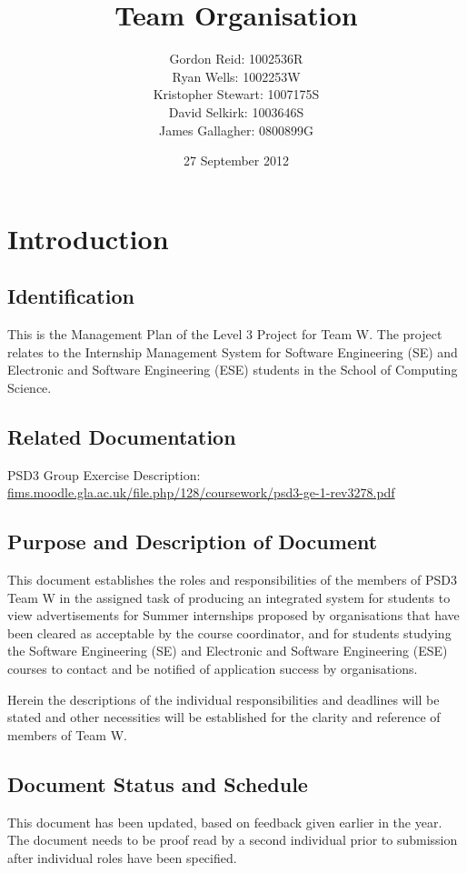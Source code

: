 \documentclass{l3deliverable}
\title{Team Organisation}
\author{
    Gordon Reid: 1002536R\\
    Ryan Wells: 1002253W\\
    Kristopher Stewart: 1007175S\\
    David Selkirk: 1003646S\\
    James Gallagher: 0800899G\\
}
\date{27 September 2012}
\begin{document}
\maketitle

\section{Introduction}

\subsection{Identification}
This is the Management Plan of the Level 3 Project for Team W.  The project 
relates to the Internship Management System for Software Engineering (SE) and 
Electronic and Software Engineering (ESE) students in the School of Computing 
Science.

\subsection{Related Documentation}
PSD3 Group Exercise Description:\\
\url{fims.moodle.gla.ac.uk/file.php/128/coursework/psd3-ge-1-rev3278.pdf}

\subsection{Purpose and Description of Document}

This document establishes the roles and responsibilities of the members of 
PSD3 Team W in the assigned task of producing an integrated system for 
students to view advertisements for Summer internships proposed by 
organisations that have been cleared as acceptable by the course coordinator, 
and for students studying the Software Engineering (SE) and Electronic and
Software Engineering (ESE) courses to contact and be notified of application 
success by organisations.

Herein the descriptions of the individual responsibilities and deadlines will 
be stated and other necessities will be established for the clarity and 
reference of members of Team W.

\subsection{Document Status and Schedule}

This document has been updated, based on feedback given earlier in the year.
The document needs to be proof read by a second individual prior to
submission after individual roles have been specified.
\end{document}
